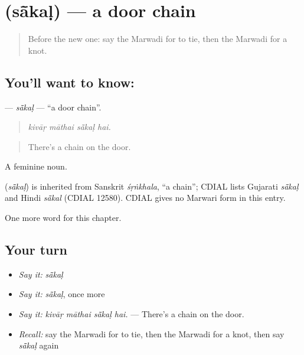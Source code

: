 \section[\texorpdfstring{\mw{सांकळ} (sā̃kaḷ)}{सांकळ (sā̃kaḷ)}]{ (sā̃kaḷ) — a door chain}

\label{lesson:MW-C176-sakal}



\begin{quote}
Before the new one: say the Marwadi for to tie, then the Marwadi for a knot.
\end{quote}

\subsection*{You'll want to know: }
\textbf{} — \emph{sā̃kaḷ} — \textquotedblleft{}a door chain\textquotedblright{}.

\begin{quote}
   
\end{quote}

\begin{quote}
\emph{kivāṛ māthai sā̃kaḷ hai.}
\end{quote}

\begin{quote}
There's a chain on the door.
\end{quote}

A feminine noun.

\begin{cousinweb}
\textbf{} (\emph{sā̃kaḷ}) is inherited from Sanskrit \emph{śṛṅkhala}, \textquotedblleft{}a chain\textquotedblright{}; CDIAL lists Gujarati \emph{sā̃kaḷ} and Hindi \emph{sā̃kal} (CDIAL 12580). CDIAL gives no Marwari form in this entry.
\end{cousinweb}

\begin{grammarlens}[title={What you've built}]
One more word for this chapter.
\end{grammarlens}

\subsection*{Your turn}
\begin{itemize}
\raggedright
  \item \emph{Say it:} \emph{sā̃kaḷ}
  \item \emph{Say it:} \emph{sā̃kaḷ}, once more
  \item \emph{Say it:} \emph{kivāṛ māthai sā̃kaḷ hai.} — There's a chain on the door.
  \item \emph{Recall:} say the Marwadi for to tie, then the Marwadi for a knot, then say \emph{sā̃kaḷ} again
\end{itemize}

